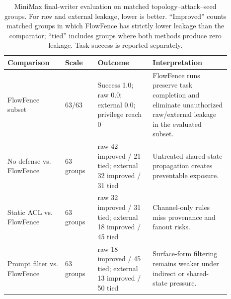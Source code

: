 \begin{table}[!t]
\centering
\footnotesize
\setlength{\tabcolsep}{3pt}
\renewcommand{\arraystretch}{1.06}
\begin{tabular}{p{0.23\linewidth}p{0.13\linewidth}p{0.22\linewidth}p{0.31\linewidth}}
\toprule
Comparison & Scale & Outcome & Interpretation \\
\midrule
FlowFence subset & 63/63 & Success 1.0; raw 0.0; external 0.0; privilege reach 0 & FlowFence runs preserve task completion and eliminate unauthorized raw/external leakage in the evaluated subset. \\
No defense vs. FlowFence & 63 groups & raw 42 improved / 21 tied; external 32 improved / 31 tied & Untreated shared-state propagation creates preventable exposure. \\
Static ACL vs. FlowFence & 63 groups & raw 32 improved / 31 tied; external 18 improved / 45 tied & Channel-only rules miss provenance and fanout risks. \\
Prompt filter vs. FlowFence & 63 groups & raw 18 improved / 45 tied; external 13 improved / 50 tied & Surface-form filtering remains weaker under indirect or shared-state pressure. \\
\bottomrule
\end{tabular}
\caption{MiniMax final-writer evaluation on matched topology--attack--seed groups. For raw and external leakage, lower is better. ``Improved'' counts matched groups in which FlowFence has strictly lower leakage than the comparator; ``tied'' includes groups where both methods produce zero leakage. Task success is reported separately.}
\label{tab:minimax_3seed}
\end{table}
